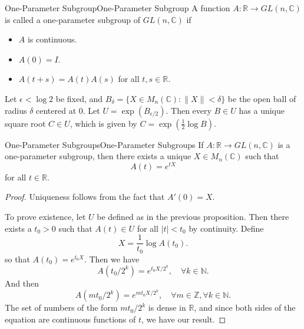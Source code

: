 \documentclass[../main.tex]{subfiles}
\begin{document}
\begin{definition}{One-Parameter Subgroup}{One-Parameter Subgroup}
  A function $A: \mathbb{R} \to GL(n, \mathbb{C})$ is called a one-parameter subgroup of $GL(n, \mathbb{C})$ if
  \begin{itemize}
    \item $A$ is continuous.
    \item $A(0) = I$.
    \item $A(t + s) = A(t)A(s)$ for all $t, s \in \mathbb{R}$.
  \end{itemize}
\end{definition}

\begin{proposition}{}{}
  Let $\epsilon < \log 2$ be fixed, and $B_\delta = \{X \in M_n(\mathbb{C}) : \|X\| < \delta\}$ be the open ball of radius $\delta$ centered at $0$. Let $U = \exp(B_{\epsilon /2})$. Then every $B\in U$ has a unique square root $C \in U$, which is given by $C = \exp (\frac{1}{2}\log B)$.
\end{proposition}

\begin{theorem}{One-Parameter Subgroups}{One-Parameter Subgroups}
  If $A: \mathbb{R} \to GL(n, \mathbb{C})$ is a one-parameter subgroup, then there exists a unique $X \in M_n(\mathbb{C})$ such that
  \begin{equation}
    A(t) = e^{tX}
  \end{equation}
  for all $t \in \mathbb{R}$.
\end{theorem}
\begin{proof}
  Uniqueness follows from the fact that $A'(0) = X$.

  To prove existence, let $U$ be defined as in the previous proposition. Then there exists a $t_0 > 0$ such that $A(t) \in U$ for all $|t| < t_0$ by continuity. Define
  \begin{equation}
    X = \frac{1}{t_0}\log A(t_0).
  \end{equation}
  so that $A(t_0) = e^{t_0X}$. Then we have
  \begin{equation}
    A(t_0 / 2^k) = e^{t_0X / 2^k}, \quad \forall k \in \mathbb{N}.
  \end{equation}
  And then
  \begin{equation}
    A(m t_0 / 2^k) = e^{mt_0X / 2^k}, \quad \forall m \in \mathbb{Z}, \forall k \in \mathbb{N}.
  \end{equation}
  The set of numbers of the form $m t_0 / 2^k$ is dense in $\mathbb{R}$, and since both sides of the equation are continuous functions of $t$, we have our result.
\end{proof}
\end{document}
